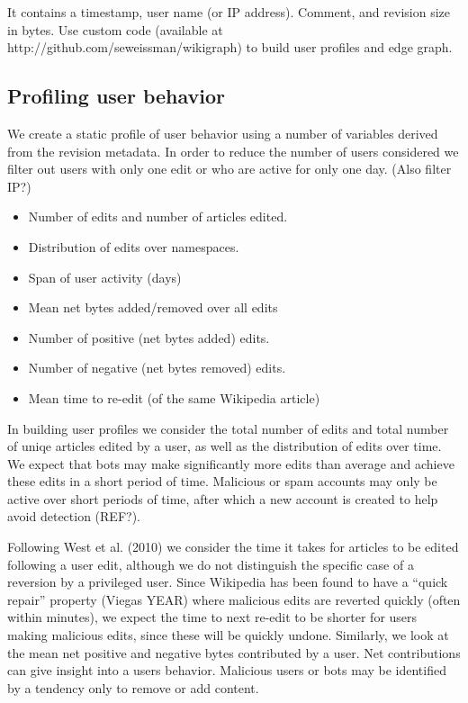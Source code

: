 \documentclass{article}
\begin{document}
It contains a timestamp, user name (or IP address). Comment, and revision size in bytes. Use custom code (available at http://github.com/seweissman/wikigraph) to build user profiles and edge graph. 

\subsection{Profiling user behavior}

We create a static profile of user behavior using a number of variables derived from the revision metadata. In order to reduce the number of users considered we filter out users with only one edit or who are active for only one day. (Also filter IP?)

\begin{itemize}
\item Number of edits and number of articles edited.
\item Distribution of edits over namespaces.
\item Span of user activity (days)
\item Mean net bytes added/removed over all edits
\item Number of positive (net bytes added) edits.
\item Number of negative (net bytes removed) edits.
\item Mean time to re-edit (of the same Wikipedia article)
\end{itemize}

In building user profiles we consider the total number of edits and total number of uniqe articles edited by a user, as well as the distribution of edits over time. We expect that bots may make significantly more edits than average and achieve these edits in a short period of time. Malicious or spam accounts may only be active over short periods of time, after which a new account is created to help avoid detection (REF?).

Following West et al. (2010) we consider the time it takes for articles to be edited following a user edit, although we do not distinguish the specific case of a reversion by a privileged user. Since Wikipedia has been found to have a ``quick repair'' property (Viegas YEAR) where malicious edits are reverted quickly (often within minutes), we expect the time to next re-edit to be shorter for users making malicious edits, since these will be quickly undone. Similarly, we look at the mean net positive and negative bytes contributed by a user. Net contributions can give insight into a users behavior. Malicious users or bots may be identified by a tendency only to remove or add content. 
\end{document}
